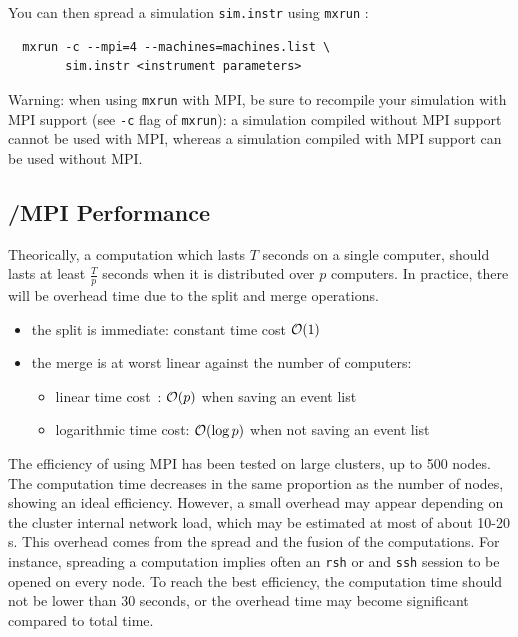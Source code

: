 You can then spread a simulation \verb'sim.instr' using \verb'mxrun' :
\begin{verbatim}
  mxrun -c --mpi=4 --machines=machines.list \
        sim.instr <instrument parameters>
\end{verbatim}

\begin{paragraph}{Warning:} when using \verb'mxrun' with MPI, be sure
  to recompile your simulation with MPI support (see \verb'-c' flag of
  \verb'mxrun'): a simulation compiled without MPI support cannot be
  used with MPI, whereas a simulation compiled with MPI support can be
  used without MPI.
\end{paragraph}

\subsection{\MCX /MPI Performance}

Theorically, a computation which lasts $T$ seconds on a single computer,
should lasts at least $\frac{T}{p}$ seconds when it is distributed
over $p$ computers. In practice, there will be overhead time due to the split
and merge operations.
\begin{itemize}
\item the split is immediate: constant time cost ${\cal O}(1)$
\item the merge is at worst linear against the number of computers:
  \begin{itemize}
  \item linear time cost~: ${\cal O}(p)$ when saving an event list
  \item logarithmic time cost: ${\cal O}(\log{p})$ when not saving an
  event list
  \end{itemize}
\end{itemize}

The efficiency of \MCX using MPI has been tested on large clusters, up to 500 nodes.
The computation time decreases in the same proportion as the number of nodes, 
showing an ideal efficiency. However, a small overhead may appear depending on the cluster 
internal network load, which may be estimated at most of about 10-20 s. 
This overhead comes from the spread and the
fusion of the computations. For instance, spreading a computation
implies often an \verb'rsh' or and \verb'ssh' session to be opened on
every node.
To reach the best efficiency, the computation time should not be lower than 30 seconds,
or the overhead time may become significant compared to total time.

